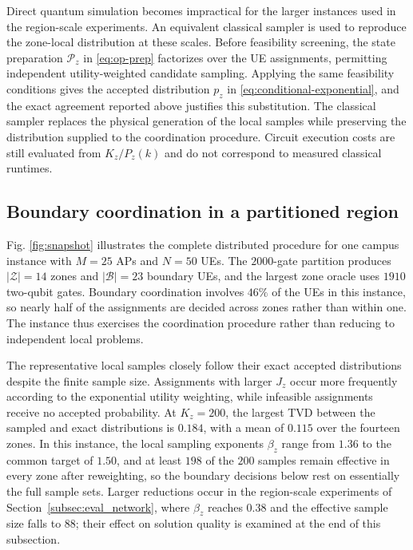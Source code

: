 Direct quantum simulation becomes impractical for the larger instances used in the region-scale experiments. An equivalent classical sampler is used to reproduce the zone-local distribution at these scales. Before feasibility screening, the state preparation $\mathcal P_z$ in \eqref{eq:op-prep} factorizes over the UE assignments, permitting independent utility-weighted candidate sampling. Applying the same feasibility conditions gives the accepted distribution $p_z$ in \eqref{eq:conditional-exponential}, and the exact agreement reported above justifies this substitution. The classical sampler replaces the physical generation of the local samples while preserving the distribution supplied to the coordination procedure. Circuit execution costs are still evaluated from $K_z/P_z(k)$ and do not correspond to measured classical runtimes.

\subsection{Boundary coordination in a partitioned region}
\label{subsec:eval_snapshot}

Fig. \ref{fig:snapshot} illustrates the complete distributed procedure for one campus instance with $M=25$ APs and $N=50$ UEs. The $2000$-gate partition produces $|\mathcal Z|=14$ zones and $|\mathcal B|=23$ boundary UEs, and the largest zone oracle uses $1910$ two-qubit gates. Boundary coordination involves $46\%$ of the UEs in this instance, so nearly half of the assignments are decided across zones rather than within one. The instance thus exercises the coordination procedure rather than reducing to independent local problems.

The representative local samples closely follow their exact accepted distributions despite the finite sample size. Assignments with larger $J_z$ occur more frequently according to the exponential utility weighting, while infeasible assignments receive no accepted probability. At $K_z=200$, the largest TVD between the sampled and exact distributions is $0.184$, with a mean of $0.115$ over the fourteen zones. In this instance, the local sampling exponents $\beta_z$ range from $1.36$ to the common target of $1.50$, and at least $198$ of the $200$ samples remain effective in every zone after reweighting, so the boundary decisions below rest on essentially the full sample sets. Larger reductions occur in the region-scale experiments of Section~\ref{subsec:eval_network}, where $\beta_z$ reaches $0.38$ and the effective sample size falls to $88$; their effect on solution quality is examined at the end of this subsection.

